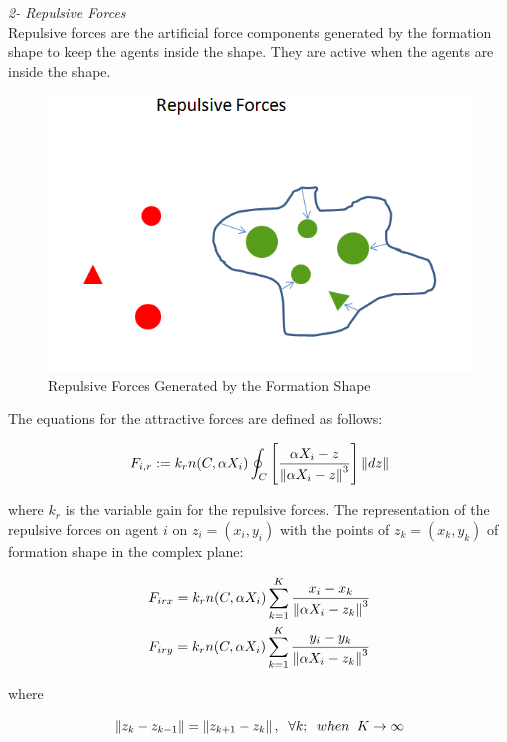 \textit{	2- Repulsive Forces} \\ 
Repulsive forces are the artificial force components generated by the formation shape to keep the agents inside the shape. They are active when the agents are inside the shape. 
					
\begin{figure}[H]
\caption{Repulsive Forces Generated by the Formation Shape}
\centering
\includegraphics[scale = 0.60]{repulsive_forces}
\end{figure}
							
The equations for the attractive forces are defined as follows:	

\begin{equation}
F_{i,r} := k_r  n(C,\alpha X_i) \oint_C \left[\frac{\alpha X_i - z}{\left\lVert\alpha X_i - z\right\rVert^3}\right] \left\lVert dz\right\rVert
\end{equation}

where $k_r$ is the variable gain for the repulsive forces. The representation of the repulsive forces on agent $i$ on $z_i = (x_i, y_i)$ with the points of  $z_k = (x_k,y_k)$ of formation shape in the complex plane:

\begin{align}
\begin{split}
& F_{irx} = k_r n(C,\alpha X_i)  \sum_{k=1}^{K} \frac{x_i - x_k}{\left\lVert\alpha X_i - z_k\right\rVert^3}\\
& F_{iry} = k_r n(C,\alpha X_i)  \sum_{k=1}^{K} \frac{y_i - y_k}{\left\lVert\alpha X_i - z_k\right\rVert^3}
\end{split}
\end{align}
				
where

\begin{equation}
\left\lVert z_k - z_{k-1}\right\rVert = \left\lVert z_{k+1} - z_k\right\rVert, \hspace{0.2cm}  \forall k ;  \hspace{0.2cm} when  \hspace{0.2cm} K \to\infty
\end{equation}
						
